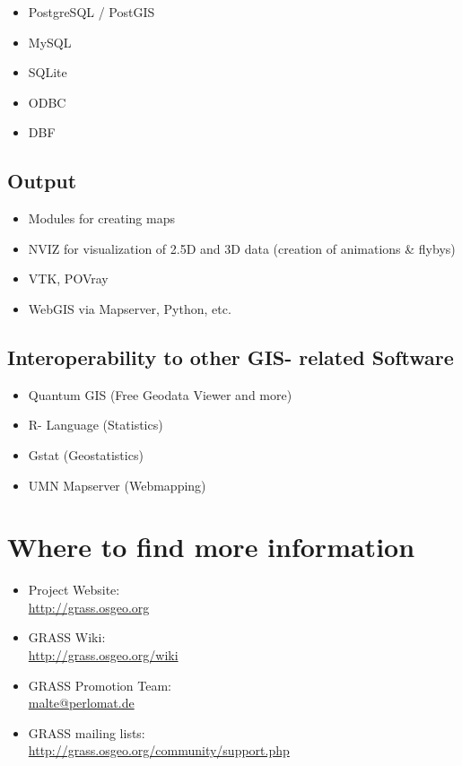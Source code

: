 \documentclass[notumble,a4paper,10pt,nofoldmark]{leaflet}
\newcommand{\GRASSurl}{\url{http://grass.osgeo.org}}
\begin{document}
\begin{itemize}
\item PostgreSQL / PostGIS
\item MySQL
\item SQLite
\item ODBC
\item DBF
\end{itemize}

\subsection{Output}

\begin{itemize}
\item Modules for creating maps
\item NVIZ for visualization of 2.5D and 3D data (creation of animations \& flybys)
\item VTK, POVray
\item WebGIS via Mapserver, Python, etc.
\end{itemize}

\subsection{Interoperability to other GIS- related Software}

\begin{itemize}
\item Quantum GIS (Free Geodata Viewer and more)
\item R- Language (Statistics)
\item Gstat (Geostatistics)
\item UMN Mapserver (Webmapping)
\end{itemize}

\section{Where to find more information}

\begin{itemize}
\item{Project Website: \\\GRASSurl}
\item{GRASS Wiki: \\\url{http://grass.osgeo.org/wiki}}
\item{GRASS Promotion Team: \\\url{malte@perlomat.de}}
\item{GRASS mailing lists: \\\url{http://grass.osgeo.org/community/support.php}}
\end{itemize}
\end{document}

